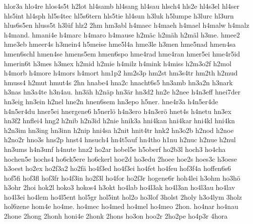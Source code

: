 {    hlor3a
    hlo4re
    hlos4s5t
    h2lot
    hl4samb
    hl4sang
    hl4sau
    hlsch4
    hls2e
    hl4s3el
    hl4ser
    hls5int
    hl4sph
    hl5s4tec
    hl5s6tern
    hls5tie
    hl4sun
    h3luk
    h5lumpe
    h3lurc
    hl3urn
    hlus6s5en
    hluss5t
    h3lüf
    hlz2
    2hm
    hm3abl
    h4maec
    h4maeh
    h4mael
    h4malw
    h4malz
    h4mand.
    hmani4e
    h4marc
    h4maro
    h4mause
    h2mäc
    h2mäh
    h2mäl
    h3me.
    hmee2
    hme3eb
    hmeer4s
    h3mein4
    h5meise
    hme5l4a
    hme3le
    h3men
    hme5nad
    hmen4sa
    hmen6schl
    hmen4se
    hmens5em
    hmen6spo
    hme4rad
    hme4ran
    hmer5ei
    hme4r5id
    hmerin6t
    h3mes
    h3mex
    h2mid
    h2mie
    h4milz
    h4mink
    h4miss
    h2m3o2f
    h2mol
    h4morb
    h4more
    h4mors
    h4mort
    hm1p2
    hm2s3p
    hm2st
    hm3s4tr
    hm2th
    h2mud
    hmuss4
    h2mut
    hmut4s
    2hn
    hnabe4
    hna2c
    hnacht6s5
    hn3amb
    hn3a2n
    h3nark
    h3nas
    hn3a4te
    h3n4au.
    hn3äh
    h2näp
    hn3är
    hn3d2
    hn2e
    h2nee
    h4n3eff
    hnei7der
    hn3eig
    hn3ein
    h2nel
    hne2n
    hnen6sem
    hn3epo
    h5ner.
    hne4r3a
    h4n5er4de
    h4n5er4du
    hner5ei
    hnergene6
    h5nerlö
    h4n3ero
    h4n3erö
    hnet4s
    h4netu
    hn3ex
    hn3f2
    hnflei4
    hng2
    h2nib
    h2n3id
    h2nie
    hnik3a
    hni4kan
    hni4kar
    hni4kl
    hni4kn
    h2n3im
    hn3ing
    hn3inn
    h2nip
    hni4sa
    h2nit
    hnit4tr
    hnk2
    hn3o2b
    h2nod
    h2noe
    h2no2r
    hno3s
    hns2p
    hnst4
    hnsuch4
    hn4t5auf
    hn4tho
    h1nu
    h2nuc
    h2nue
    h2nul
    hn3ums
    h4n3unf
    h4nute
    hnz2
    ho2ar
    hobel5e
    h5oberf
    ho2b3l
    hoch3
    ho4cha
    hochen5e
    hochs4
    ho6ck5ere
    ho6ckerl
    hoe2d
    ho3edu
    2hoee
    hoe2s
    hoes3c
    h3oese
    h3oest
    ho2ex
    ho2f3a2
    ho2fä
    ho4f3ed
    ho4f3ei
    ho4fet
    ho4feu
    hof3f4a
    hoffen6s6
    hof5fi
    hof3fl
    hof3fr
    ho4f3in
    ho2f3l
    ho4for
    ho2f3r
    hogene6r
    hoh4lei
    h3ohm
    ho3hö
    h3ohr
    2hoi
    hok2l
    hoko3
    hokos4
    h3okt
    ho4lab
    ho4l3ak
    ho4l3an
    ho4l3au
    ho4lav
    ho4l3ei
    ho4lem
    ho4l5ent
    hol5gr
    hol5int
    hol2o
    ho3lof
    3holst
    2holy
    h3o4lym
    3holz
    hol6zene
    hom4e
    ho4me.
    ho4mec
    ho4med
    ho4mel
    ho4meo
    2hon.
    ho4nar
    ho4nau
    2hone
    2hong
    2honh
    honi4e
    2honk
    2hons
    ho3on
    hoo2r
    2ho2pe
    ho4p3r
    4hora
}
